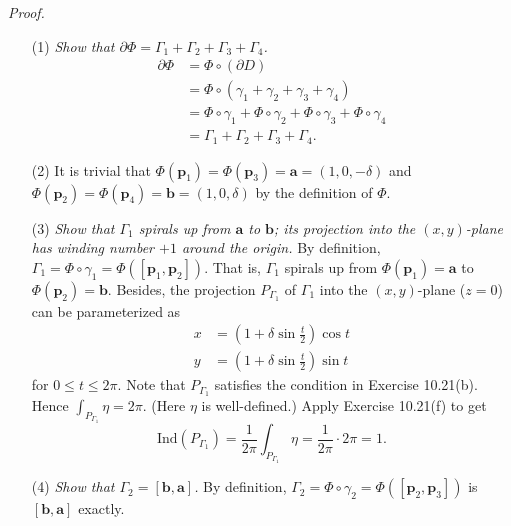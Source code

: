 \documentclass{article}
\begin{document}
\emph{Proof.}
\begin{enumerate}
\item[(1)]
  \emph{Show that $\partial \Phi = \Gamma_1 + \Gamma_2 + \Gamma_3 + \Gamma_4$.}
  \begin{align*}
    \partial \Phi
    &= \Phi \circ (\partial D) \\
    &= \Phi \circ (\gamma_1 + \gamma_2 + \gamma_3 + \gamma_4) \\
    &= \Phi \circ \gamma_1 + \Phi \circ \gamma_2 + \Phi \circ \gamma_3 + \Phi \circ \gamma_4 \\
    &= \Gamma_1 + \Gamma_2 + \Gamma_3 + \Gamma_4.
  \end{align*}

\item[(2)]
  It is trivial that
  $\Phi(\mathbf{p}_1) = \Phi(\mathbf{p}_3) = \mathbf{a} = (1,0,-\delta)$
  and
  $\Phi(\mathbf{p}_2) = \Phi(\mathbf{p}_4) = \mathbf{b} = (1,0,\delta)$
  by the definition of $\Phi$.

\item[(3)]
  \emph{Show that $\Gamma_1$ spirals up from $\mathbf{a}$ to $\mathbf{b}$;
  its projection into the $(x,y)$-plane has winding number $+1$ around the origin.}
  By definition,
  $\Gamma_1 = \Phi \circ \gamma_1 = \Phi([\mathbf{p}_1, \mathbf{p}_2])$.
  That is,
  $\Gamma_1$ spirals up from $\Phi(\mathbf{p}_1) = \mathbf{a}$
  to $\Phi(\mathbf{p}_2) = \mathbf{b}$.
  Besides, the projection $P_{\Gamma_1}$ of $\Gamma_1$ into the $(x,y)$-plane ($z = 0$)
  can be parameterized as
  \begin{align*}
    x &= \left(1+\delta\sin\frac{t}{2}\right) \cos t \\
    y &= \left(1+\delta\sin\frac{t}{2}\right) \sin t
  \end{align*}
  for $0 \leq t \leq 2\pi$.
  Note that $P_{\Gamma_1}$ satisfies the condition in Exercise 10.21(b).
  Hence $\int_{P_{\Gamma_1}} \eta = 2\pi$.
  (Here $\eta$ is well-defined.)
  Apply Exercise 10.21(f) to get
  \[
    \mathrm{Ind}(P_{\Gamma_1})
    = \frac{1}{2\pi} \int_{P_{\Gamma_1}} \eta
    = \frac{1}{2\pi} \cdot 2\pi
    = 1.
  \]

\item[(4)]
  \emph{Show that $\Gamma_2 = [\mathbf{b}, \mathbf{a}]$.}
  By definition,
  $\Gamma_2 = \Phi \circ \gamma_2 = \Phi([\mathbf{p}_2, \mathbf{p}_3])$
  is $[\mathbf{b}, \mathbf{a}]$ exactly.


\end{enumerate}
\end{document}
